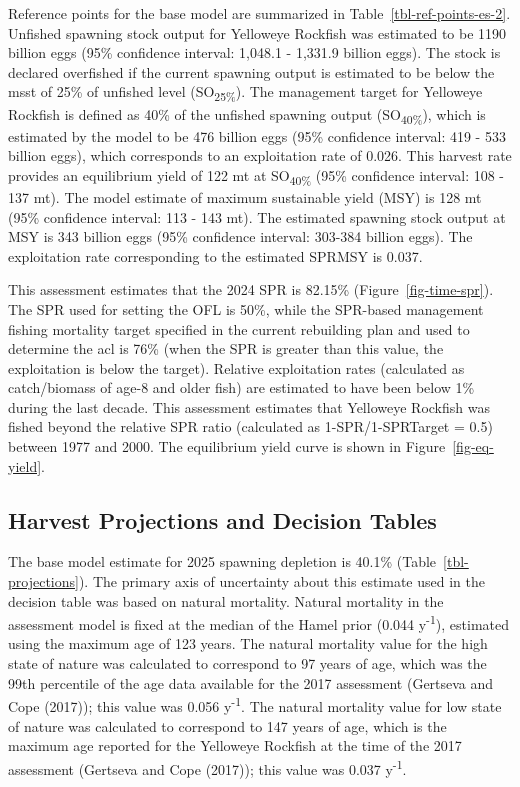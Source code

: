 \documentclass[
  english,
]{article}
\begin{document}
Reference points for the base model are summarized in
Table~\ref{tbl-ref-points-es-2}. Unfished spawning stock output for
Yelloweye Rockfish was estimated to be 1190 billion eggs (95\%
confidence interval: 1,048.1 - 1,331.9 billion eggs). The stock is
declared overfished if the current spawning output is estimated to be
below the \gls{msst} of 25\% of unfished level (SO\textsubscript{25\%}).
The management target for Yelloweye Rockfish is defined as 40\% of the
unfished spawning output (SO\textsubscript{40\%}), which is estimated by
the model to be 476 billion eggs (95\% confidence interval: 419 - 533
billion eggs), which corresponds to an exploitation rate of 0.026. This
harvest rate provides an equilibrium yield of 122 mt at
SO\textsubscript{40\%} (95\% confidence interval: 108 - 137 mt). The
model estimate of maximum sustainable yield (MSY) is 128 mt (95\%
confidence interval: 113 - 143 mt). The estimated spawning stock output
at MSY is 343 billion eggs (95\% confidence interval: 303-384 billion
eggs). The exploitation rate corresponding to the estimated SPRMSY is
0.037.

This assessment estimates that the 2024 SPR is 82.15\%
(Figure~\ref{fig-time-spr}). The SPR used for setting the OFL is 50\%,
while the SPR-based management fishing mortality target specified in the
current rebuilding plan and used to determine the \gls{acl} is 76\%
(when the SPR is greater than this value, the exploitation is below the
target). Relative exploitation rates (calculated as catch/biomass of
age-8 and older fish) are estimated to have been below 1\% during the
last decade. This assessment estimates that Yelloweye Rockfish was
fished beyond the relative SPR ratio (calculated as 1-SPR/1-SPRTarget =
0.5) between 1977 and 2000. The equilibrium yield curve is shown in
Figure~\ref{fig-eq-yield}.

\subsection{Harvest Projections and Decision
Tables}\label{harvest-projections-and-decision-tables}

The base model estimate for 2025 spawning depletion is 40.1\%
(Table~\ref{tbl-projections}). The primary axis of uncertainty about
this estimate used in the decision table was based on natural mortality.
Natural mortality in the assessment model is fixed at the median of the
Hamel prior (0.044 y\textsuperscript{-1}), estimated using the maximum
age of 123 years. The natural mortality value for the high state of
nature was calculated to correspond to 97 years of age, which was the
99th percentile of the age data available for the 2017 assessment
(Gertseva and Cope (2017)); this value was 0.056 y\textsuperscript{-1}.
The natural mortality value for low state of nature was calculated to
correspond to 147 years of age, which is the maximum age reported for
the Yelloweye Rockfish at the time of the 2017 assessment (Gertseva and
Cope (2017)); this value was 0.037 y\textsuperscript{-1}.
\end{document}
